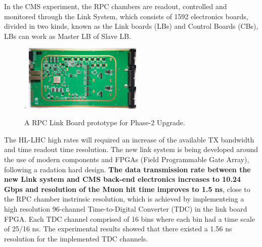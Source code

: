 




In the CMS experiment, the RPC chambers are readout, controlled and monitored through the Link System, which consists of 1592 electronics boards, divided in two kinds, known as the Link boards (LBs) and Control Boards (CBs), LBs can work as Master LB of Slave LB.  


\begin{figure}
    \caption{A RPC Link Board prototype for Phase-2 Upgrade.}
    \label{link_system}.
    \includegraphics[width=0.5\textwidth]{uioposter-images/link_system_board.png}
\end{figure}

The HL-LHC high rates will required an increase of the available TX bandwidth and time readout time resolution. The new link system is being developed around the use of modern components and FPGAs (Field Programmable Gate Array), following a radation hard design. \textbf{The data transmission rate between the new Link system and CMS back-end electronics increases to 10.24 Gbps and resolution of the Muon hit time improves to 1.5 ns}, close to the RPC chamber instrinsic resolution, which is achieved by implementeing a high resolution 96-channel Time-to-Digital Converter (TDC) in the link board FPGA. Each TDC channel comprised of 16 bins where each bin had a time scale of 25/16 ns. The experimental results showed that there existed a 1.56 ns resolution for the implemented TDC channels. 







